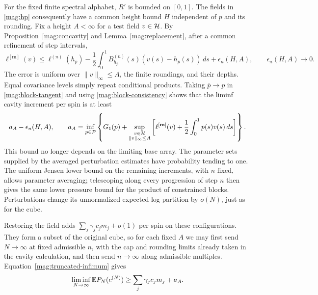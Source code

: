 For the fixed finite spectral alphabet, $R'$ is bounded on $[0,1]$.
The fields in \eqref{mag:hp} consequently have a common height bound
$H$ independent of $p$ and its rounding. Fix a height $A<\infty$ for
a test field $v\in\mathcal H$. By Proposition~\ref{mag:concavity} and
Lemma~\ref{mag:replacement}, after a common refinement of step intervals,
\begin{equation}\label{mag:block-tangent}
 \ell^{[\mathbf m]}(v)
 \le\ell^{(n)}(h_{\bar p})
       -\frac12\int_0^1 B^{(n)}_{h_{\bar p}}(s)
                              (v(s)-h_{\bar p}(s))\,ds
       +\epsilon_n(H,A),
 \qquad \epsilon_n(H,A)\longrightarrow0.
\end{equation}
The error is uniform over $\|v\|_\infty\le A$, the finite roundings,
and their depths. Equal covariance levels simply repeat conditional
products. Taking $\bar p\to p$ in \eqref{mag:block-tangent} and using
\eqref{mag:block-consistency} shows that the liminf cavity increment per
spin is at least
\begin{equation}\label{mag:truncated-infimum}
 a_A-\epsilon_n(H,A),\qquad
 a_A=\inf_{p\in\mathcal P}\left\{G_1(p)+
       \sup_{\substack{v\in\mathcal H\\\|v\|_\infty\le A}}
          \left[\ell^{[\mathbf m]}(v)+\frac12\int_0^1p(s)v(s)\,ds\right]
                         \right\}.
\end{equation}
This bound no longer depends on the limiting base array. The parameter
sets supplied by the averaged perturbation estimates have probability
tending to one. The uniform Jensen lower bound on the remaining
increments, with $n$ fixed, allows parameter averaging; telescoping along
every progression of step $n$ then gives the same lower pressure bound
for the product of constrained blocks. Perturbations change its
unnormalized expected log partition by $o(N)$, just as for the cube.

Restoring the field adds
$\sum_j\gamma_jc_jm_j+o(1)$ per spin on these configurations. They form
a subset of the original cube, so for each fixed $A$ we may first send
$N\to\infty$ at fixed admissible $n$, with the cap and rounding limits
already taken in the cavity calculation, and then send $n\to\infty$
along admissible multiples. Equation~\eqref{mag:truncated-infimum} gives
\[
 \liminf_{N\to\infty}\mathbb E P_N(c^{(N)})
        \ge\sum_j\gamma_jc_jm_j+a_A.
\]

